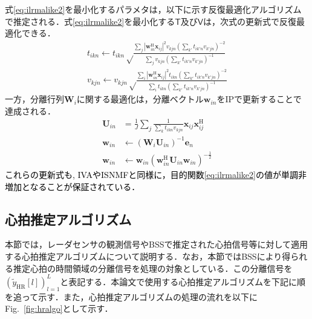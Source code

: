 \documentclass[10.5pt]{jarticle}
\begin{document}
{式\eqref{eq:ilrmalike2}を最小化するパラメタは，以下に示す反復最適化アルゴリズムで推定される．式\eqref{eq:ilrmalike2}を最小化する$\mathsf{T}$及び$\mathsf{V}$は，次式の更新式で反復最適化できる．
\begin{align}
    t_{ikn} \leftarrow t_{ikn} \sqrt \frac{ \sum_j |\bm{w}_{in}^{\mathrm{H}}\bm{x}_{ij}|^2 v_{kjn} \left( \sum_{k'} t_{ik'n} v_{k'jn} \right)^{-2} }{ \sum_j v_{kjn} \left( \sum_{k'} t_{ik'n} v_{k'jn} \right)^{-1} } \label{eq:MUTilrma} \\
    v_{kjn} \leftarrow v_{kjn} \sqrt \frac{ \sum_i |\bm{w}_{in}^{\mathrm{H}}\bm{x}_{ij}|^2 t_{ikn} \left( \sum_{k'} t_{ik'n} v_{k'jn} \right)^{-2} }{ \sum_i t_{ikn} \left( \sum_{k'} t_{ik'n} v_{k'jn} \right)^{-1} } \label{eq:MUVilrma}
\end{align}
一方，分離行列$\bm{W}_i$に関する最適化は，分離ベクトル$\bm{w}_{in}$をIPで更新することで達成される．
\begin{align}
\bm{U}_{in} &= \frac{1}{J} \sum_j \frac{1}{\sum_{k}t_{ikn}v_{kjn}} \bm{x}_{ij} \bm{x}_{ij}^{\mathrm{H}} \label{eq:ip1} \\
\bm{w}_{in} &\leftarrow (\bm{W}_i \bm{U}_{in})^{-1} \bm{e}_n \label{eq:ip2} \\
\bm{w}_{in} &\leftarrow \bm{w}_{in} ( \bm{w}_{in}^{\mathrm{H}} \bm{U}_{in} \bm{w}_{in} )^{-\frac{1}{2}} \label{eq:ip3}
\end{align}
\textcolor{black}{これらの更新式も, IVAやISNMFと同様に，目的関数\eqref{eq:ilrmalike2}の値が単調非増加となることが保証されている．}

\subsection{心拍推定アルゴリズム}

\hspace{1.0em}本節では，レーダセンサの観測信号やBSSで推定された心拍信号等に対して適用する心拍推定アルゴリズムについて説明する．なお，本節ではBSSにより得られる推定心拍の時間領域の分離信号を処理の対象としている．この分離信号を$( \tilde{y}_\mathrm{HR}[l] )_{l=1}^L$と表記する．本論文で使用する心拍推定アルゴリズムを下記に順を追って示す．また，心拍推定アルゴリズムの処理の流れを以下にFig.~\ref{fig:hralgo}として示す．

}
\end{document}
